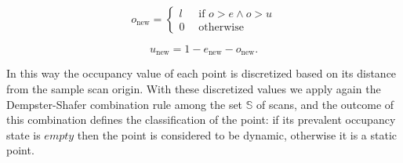 \begin{equation}
 o_{\text{new}} = \begin{cases}
      l\ \ \ &\mbox{if }o > e \wedge o > u \\
      0 &\mbox{otherwise}
     \end{cases}
\end{equation}

\begin{equation}
 u_{\text{new}} = 1 - e_{\text{new}} - o_{\text{new}}.
\end{equation}

 In this way the occupancy value of each point is discretized based on its distance from the sample scan origin. With these discretized values we apply again the Dempster-Shafer combination rule among the set $\mathbb{S}$ of scans, and the outcome of this combination defines the classification of the point: if its prevalent occupancy state is $empty$ then the point is considered to be dynamic, otherwise it is a static point. 
  
 

